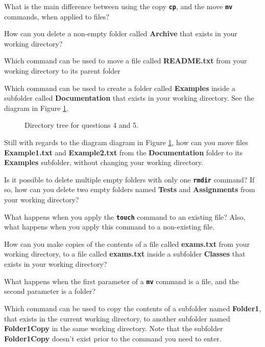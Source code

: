 \begin{exercises}
   \item What is the main difference between using the copy \textbf{\texttt{cp}}, and the move \textbf{\texttt{mv}} commands, when applied to files?
   \item How can you delete a non-empty folder called \textbf{Archive} that exists in your working directory?
   \item Which command can be used to move a file called \textbf{README.txt} from your working directory to its parent folder
   \item Which command can be used to create a folder called \textbf{Examples} inside a subfolder called \textbf{Documentation} that exists in your working directory. See the diagram in Figure \ref{fig:ch3_dirtree}.
   \begin{figure}[!htbp]
     \centering
           
           \caption{Directory tree for questions 4 and 5.}
           \label{fig:ch3_dirtree}
   \end{figure}
   \item Still with regards to the diagram diagram in Figure \ref{fig:ch3_dirtree}, how can you move files \textbf{Example1.txt} and \textbf{Example2.txt} from the \textbf{Documentation} folder to its \textbf{Examples} subfolder, without changing your working directory.
   \item Is it possible to delete multiple empty folders with only one \textbf{\texttt{rmdir}} command? If so, how can you delete two empty folders named \textbf{Tests} and \textbf{Assignments} from your working directory?
   \item What happens when you apply the \textbf{\texttt{touch}} command to an existing file? Also, what happens when you apply this command to a non-existing file.
   \item How can you make copies of the contents of a file called \textbf{exams.txt} from your working directory, to a file called \textbf{exams.txt} inside a subfolder \textbf{Classes} that exists in your working directory?
   \item What happens when the first parameter of a \textbf{\texttt{mv}} command is a file, and the second parameter is a folder?
   \item Which command can be used to copy the contents of a subfolder named \textbf{Folder1}, that exists in the current working directory, to another subfolder named  \textbf{Folder1Copy} in the same working directory. Note that the subfolder \textbf{Folder1Copy} doesn't exist prior to the command you need to enter.
\end{exercises}
